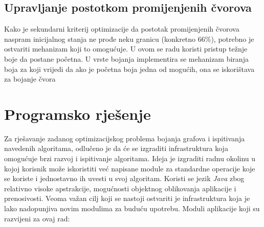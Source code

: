 \documentclass[times, utf8, diplomski, numeric]{fer}
\begin{document}
\section{Upravljanje postotkom promijenjenih čvorova}

Kako je sekundarni kriterij optimizacije da postotak promijenjenih čvorova naspram inicijalnog stanja ne prođe neku granicu (konkretno 66\%), potrebno je ostvariti mehanizam koji to omogućuje. U ovom se radu koristi pristup težnje boje da postane početna. U vrste bojanja implementira se mehanizam biranja boja za koji vrijedi da ako je početna boja jedna od mogućih, ona se iskorištava za bojanje čvora

\chapter{Programsko rješenje}

Za rješavanje zadanog optimizacijskog problema bojanja grafova i ispitivanja navedenih algoritama, odlučeno je da će se izgraditi infrastruktura koja omogućuje brzi razvoj i ispitivanje algoritama. Ideja je izgraditi radnu okolinu u kojoj korisnik može iskoristiti već napisane module za standardne operacije koje se koriste i jednostavno ih uvesti u svoj algoritam. Koristi se jezik \emph{Java} zbog relativno visoke apstrakcije, mogućnosti objektnog oblikovanja aplikacije i prenosivosti. Veoma važan cilj koji se nastoji ostvariti je infrastruktura koja je lako nadopunjiva novim modulima za buduću upotrebu. Moduli aplikacije koji su razvijeni za ovaj rad:
\end{document}
